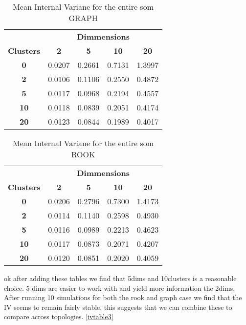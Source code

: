 \begin{table}
\caption{Mean Internal Variane for the entire som GRAPH}
\label{ivtable1}
\begin{tabular}{|c||c|c|c|c|}
\hline
&\multicolumn{4}{c|}{\textbf{Dimmensions}}\\
\textbf{Clusters} & \multicolumn{1}{c}{\textbf{2}} &
\multicolumn{1}{c}{\textbf{5}} & \multicolumn{1}{c}{\textbf{10}} &
\multicolumn{1}{c|}{\textbf{20}}\\
\hline
\hline
\textbf{0} & 0.0207& 0.2661& 0.7131& 1.3997 \\
\hline
\textbf{2} & 0.0106& 0.1106& 0.2550& 0.4872 \\
\hline
\textbf{5} & 0.0117& 0.0968& 0.2194& 0.4557 \\
\hline
\textbf{10} & 0.0118& 0.0839& 0.2051& 0.4174 \\
\hline
\textbf{20} & 0.0123& 0.0844& 0.1989& 0.4017 \\
\hline
\end{tabular} \end{table}



\begin{table}
\caption{Mean Internal Variane for the entire som ROOK}
\label{ivtable2}
\begin{tabular}{|c||c|c|c|c|}
\hline
&\multicolumn{4}{c|}{\textbf{Dimmensions}}\\
\textbf{Clusters} & \multicolumn{1}{c}{\textbf{2}} &
\multicolumn{1}{c}{\textbf{5}} & \multicolumn{1}{c}{\textbf{10}} &
\multicolumn{1}{c|}{\textbf{20}}\\
\hline
\hline
\textbf{0} & 0.0206& 0.2796& 0.7300& 1.4173 \\
\hline
\textbf{2} & 0.0114& 0.1140& 0.2598& 0.4930 \\
\hline
\textbf{5} & 0.0116& 0.0989& 0.2213& 0.4623 \\
\hline
\textbf{10} & 0.0117& 0.0873& 0.2071& 0.4207 \\
\hline
\textbf{20} & 0.0120& 0.0851& 0.2020& 0.4059 \\
\hline
\end{tabular} \end{table}



ok after adding these tables we find that 5dims and 10clusters is a reasonable
choice. 5 dims are easier to work with and yield more information the 2dims.
After running 10 simulations for both the rook and graph case we find that the
IV seems to remain fairly stable, this suggests that we can combine these to
compare across topologies.
\ref{ivtable3}

